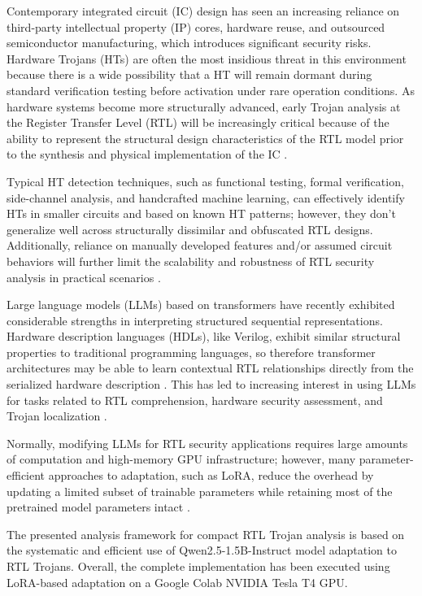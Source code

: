 \documentclass[conference]{IEEEtran}
\begin{document}
Contemporary integrated circuit (IC) design has seen an increasing reliance on third-party intellectual property (IP) cores, hardware reuse, and outsourced semiconductor manufacturing, which introduces significant security risks. Hardware Trojans (HTs) are often the most insidious threat in this environment because there is a wide possibility that a HT will remain dormant during standard verification testing before activation under rare operation conditions. As hardware systems become more structurally advanced, early Trojan analysis at the Register Transfer Level (RTL) will be increasingly critical because of the ability to represent the structural design characteristics of the RTL model prior to the synthesis and physical implementation of the IC \cite{tehranipoor2010survey,jin2008pathdelay}.

Typical HT detection techniques, such as functional testing, formal verification, side-channel analysis, and handcrafted machine learning, can effectively identify HTs in smaller circuits and based on known HT patterns; however, they don't generalize well across structurally dissimilar and obfuscated RTL designs. Additionally, reliance on manually developed features and/or assumed circuit behaviors will further limit the scalability and robustness of RTL security analysis in practical scenarios \cite{tehranipoor2010survey,jin2008pathdelay}.

Large language models (LLMs) based on transformers have recently exhibited considerable strengths in interpreting structured sequential representations. Hardware description languages (HDLs), like Verilog, exhibit similar structural properties to traditional programming languages, so therefore transformer architectures may be able to learn contextual RTL relationships directly from the serialized hardware description \cite{vaswani2017attention}. This has led to increasing interest in using LLMs for tasks related to RTL comprehension, hardware security assessment, and Trojan localization \cite{kundu2025pearl,trojanwhisper}.

Normally, modifying LLMs for RTL security applications requires large amounts of computation and high-memory GPU infrastructure; however, many parameter-efficient approaches to adaptation, such as LoRA, reduce the overhead by updating a limited subset of trainable parameters while retaining most of the pretrained model parameters intact \cite{lora}. 

The presented analysis framework for compact RTL Trojan analysis is based on the systematic and efficient use of Qwen2.5-1.5B-Instruct model adaptation to RTL Trojans. Overall, the complete implementation has been executed using LoRA-based adaptation on a Google Colab NVIDIA Tesla T4 GPU.
\end{document}
